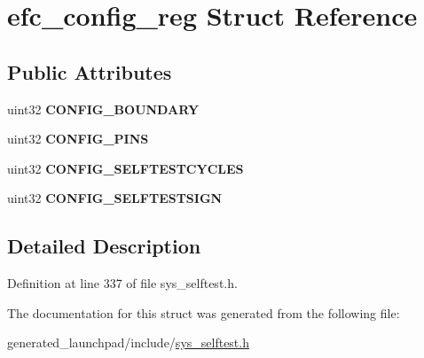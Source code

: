\hypertarget{structefc__config__reg}{}\section{efc\+\_\+config\+\_\+reg Struct Reference}
\label{structefc__config__reg}
\subsection*{Public Attributes}
\begin{DoxyCompactItemize}
\item 
\mbox{\label{structefc__config__reg_af047cc1abe2ff223ba3ebf0304d72f48}} 
uint32 {\bfseries C\+O\+N\+F\+I\+G\+\_\+\+B\+O\+U\+N\+D\+A\+RY}
\item 
\mbox{\label{structefc__config__reg_ac5abca109dca8b8f3df2655387a70e90}} 
uint32 {\bfseries C\+O\+N\+F\+I\+G\+\_\+\+P\+I\+NS}
\item 
\mbox{\label{structefc__config__reg_ae785b7f82da800986ae664e618522b56}} 
uint32 {\bfseries C\+O\+N\+F\+I\+G\+\_\+\+S\+E\+L\+F\+T\+E\+S\+T\+C\+Y\+C\+L\+ES}
\item 
\mbox{\label{structefc__config__reg_af38ea96963791fca2ecef6d58562683d}} 
uint32 {\bfseries C\+O\+N\+F\+I\+G\+\_\+\+S\+E\+L\+F\+T\+E\+S\+T\+S\+I\+GN}
\end{DoxyCompactItemize}


\subsection{Detailed Description}


Definition at line 337 of file sys\+\_\+selftest.\+h.



The documentation for this struct was generated from the following file\+:\begin{DoxyCompactItemize}
\item 
generated\+\_\+launchpad/include/\mbox{\hyperlink{sys__selftest_8h}{sys\+\_\+selftest.\+h}}\end{DoxyCompactItemize}
